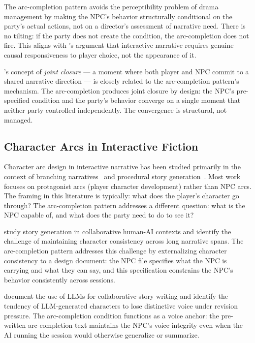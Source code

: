 The arc-completion pattern avoids the perceptibility problem of drama management by
making the NPC's behavior structurally conditional on the party's actual actions, not
on a director's assessment of narrative need. There is no tilting: if the party does
not create the condition, the arc-completion does not fire. This aligns with
\citet{crawford2013}'s argument that interactive narrative requires genuine causal
responsiveness to player choice, not the appearance of it.

\citeauthor{mateas2003faade}'s concept of \textit{joint closure} --- a moment where
both player and NPC commit to a shared narrative direction --- is closely related
to the arc-completion pattern's mechanism. The arc-completion produces joint
closure by design: the NPC's pre-specified condition and the party's behavior
converge on a single moment that neither party controlled independently. The
convergence is structural, not managed.

\subsection{Character Arcs in Interactive Fiction}

Character arc design in interactive narrative has been studied primarily in
the context of branching narratives~\cite{ryan2017narrative} and procedural
story generation~\cite{riedl2016, fan2019}. Most work focuses on protagonist
arcs (player character development) rather than NPC arcs. The framing in
this literature is typically: what does the player's character go through?
The arc-completion pattern addresses a different question: what is the NPC
capable of, and what does the party need to do to see it?

\citet{akoury2020} study story generation in collaborative human-AI contexts
and identify the challenge of maintaining character consistency across long
narrative spans. The arc-completion pattern addresses this challenge by
externalizing character consistency to a design document: the NPC file
specifies what the NPC is carrying and what they can say, and this specification
constrains the NPC's behavior consistently across sessions.

\citet{yuan2022wordcraft} document the use of LLMs for collaborative story
writing and identify the tendency of LLM-generated characters to lose
distinctive voice under revision pressure. The arc-completion condition
functions as a voice anchor: the pre-written arc-completion text maintains
the NPC's voice integrity even when the AI running the session would otherwise
generalize or summarize.

